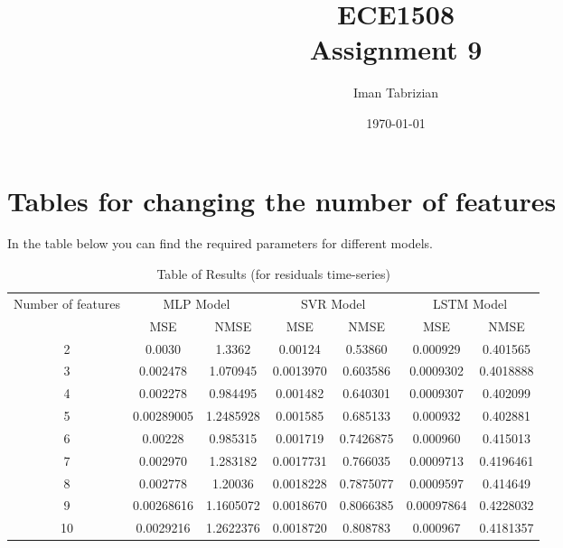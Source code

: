 \documentclass{article}
\title{ECE1508 \\Assignment 9}
\author{Iman Tabrizian}
\date{\today}
\begin{document}
\maketitle

\section{Tables for changing the number of features}

In the table below you can find the required parameters for different models.

\begin{table}[h]
	\begin{tabular}{ccccccc}
		\toprule
		\multirow{2}{*}{Number of features} & \multicolumn{2}{c}{MLP Model} & \multicolumn{2}{c}{SVR Model} & \multicolumn{2}{c}{LSTM Model} \\ 
		\cmidrule {2-7}
		 & MSE & NMSE & MSE & NMSE & MSE & NMSE  \\
		\midrule
		2 & 0.0030 & 1.3362 & 0.00124 & 0.53860 & 0.000929 & 0.401565 \\
		\midrule
		3 & 0.002478 & 1.070945 & 0.0013970 & 0.603586 &  0.0009302 &  0.4018888 \\
		\midrule
		4 & 0.002278 & 0.984495 & 0.001482 & 0.640301 & 0.0009307 & 0.402099 \\
		\midrule
		5 & 0.00289005 & 1.2485928 & 0.001585 & 0.685133 & 0.000932 & 0.402881 \\
		\midrule
		6 & 0.00228 & 0.985315 & 0.001719 & 0.7426875 & 0.000960 & 0.415013 \\
		\midrule
		7 & 0.002970 & 1.283182 & 0.0017731 & 0.766035 & 0.0009713 & 0.4196461 \\
		\midrule
		8 & 0.002778 & 1.20036 & 0.0018228 & 0.7875077 & 0.0009597 & 0.414649 \\
		\midrule
		9 & 0.00268616 & 1.1605072 & 0.0018670 & 0.8066385 & 0.00097864 & 0.4228032 \\
		\midrule
		10 & 0.0029216 & 1.2622376 & 0.0018720 & 0.808783 & 0.000967 & 0.4181357  \\
		\bottomrule
	\end{tabular}
	\caption{Table of Results (for residuals time-series)}
\end{table}
\end{document}
